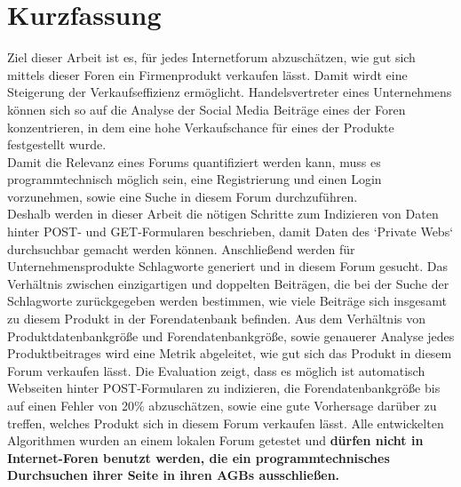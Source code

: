 \documentclass[%
a4paper,
DIV12, 
2.5headlines, 
bigheadings, 
titlepage, 
openbib,
]{scrartcl}
\newcommand{\mainmatter}{\pagenumbering{arabic}\setcounter{page}{1}}
\begin{document}
\section*{Kurzfassung}{
Ziel dieser Arbeit ist es, für jedes Internetforum abzuschätzen, wie gut sich mittels dieser Foren ein Firmenprodukt verkaufen lässt. Damit wirdt eine Steigerung der Verkaufseffizienz ermöglicht. Handelsvertreter eines Unternehmens können sich so auf die Analyse der Social Media Beiträge eines der Foren konzentrieren, in dem eine hohe Verkaufschance für eines der Produkte festgestellt wurde.\\
Damit die Relevanz eines Forums quantifiziert werden kann, muss es programmtechnisch möglich sein, eine Registrierung und einen Login vorzunehmen, sowie eine Suche in diesem Forum durchzuführen. \\ Deshalb werden in dieser Arbeit die nötigen Schritte zum Indizieren von Daten hinter POST- und GET-Formularen beschrieben, damit Daten des `Private Webs` durchsuchbar gemacht werden können. Anschließend werden für Unternehmensprodukte Schlagworte generiert und in diesem Forum gesucht. Das Verhältnis zwischen einzigartigen und doppelten Beiträgen, die bei der Suche der Schlagworte zurückgegeben werden bestimmen, wie viele Beiträge sich insgesamt zu diesem Produkt in der Forendatenbank befinden. Aus dem Verhältnis von Produktdatenbankgröße und Forendatenbankgröße, sowie genauerer Analyse jedes Produktbeitrages wird eine Metrik abgeleitet, wie gut sich das Produkt in diesem Forum verkaufen lässt. Die Evaluation zeigt, dass es möglich ist automatisch Webseiten hinter POST-Formularen zu indizieren, die Forendatenbankgröße bis auf einen Fehler von 20\% abzuschätzen, sowie eine gute Vorhersage darüber zu treffen, welches Produkt sich in diesem Forum verkaufen lässt. Alle entwickelten Algorithmen wurden an einem lokalen Forum getestet und \textbf{dürfen nicht in Internet-Foren benutzt werden, die ein programmtechnisches Durchsuchen ihrer Seite in ihren AGBs ausschließen.}}


\newpage
	
	\tableofcontents
	\clearpage
	\mainmatter

	
	
	
	
		
	
	\clearpage
	\nocite{*}
    	
   	
   	
	
\end{document}
